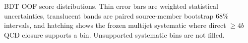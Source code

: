 BDT OOF score distributions. Thin error bars are weighted statistical uncertainties, translucent bands are paired source-member bootstrap 68\% intervals, and hatching shows the frozen multijet systematic where direct $\geq4b$ QCD closure supports a bin. Unsupported systematic bins are not filled.
